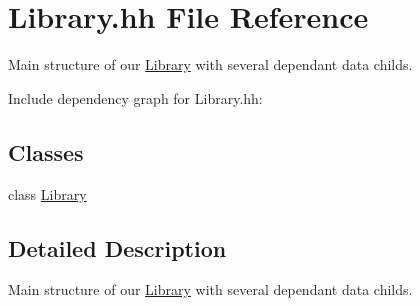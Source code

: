 \hypertarget{_library_8hh}{}\section{Library.\+hh File Reference}
\label{_library_8hh}


Main structure of our \hyperlink{class_library}{Library} with several dependant data childs.  


Include dependency graph for Library.\+hh\+:
\subsection*{Classes}
\begin{DoxyCompactItemize}
\item 
class \hyperlink{class_library}{Library}
\end{DoxyCompactItemize}


\subsection{Detailed Description}
Main structure of our \hyperlink{class_library}{Library} with several dependant data childs. 

